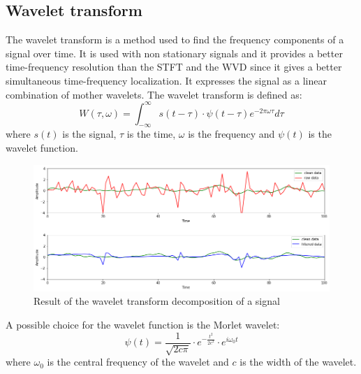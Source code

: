 \documentclass[a4paper]{sapthesis}
\begin{document}
\subsection{Wavelet transform}\label{sec:wavelet}
The wavelet transform\cite{wavelet} is a method used to find the frequency
components of a signal over time. It is used with non stationary signals and it
provides a better time-frequency resolution than the STFT and the WVD 
since it gives a better simultaneous time-frequency localization. \newline
It expresses the signal as a linear combination of mother wavelets.
The wavelet transform is defined as:
\begin{equation}
\label{eq:wavelet}
W(\tau, \omega) = \int_{-\infty}^{\infty} s(t-\tau) \cdot \psi(t-\tau) e^{-2\pi\omega \tau} d\tau
\end{equation}
where $s(t)$ is the signal, $\tau$ is the time, $\omega$ is the frequency
and $\psi(t)$ is the wavelet function. \newline
\begin{figure}[h]
  \includegraphics[scale=0.45]{wavelet_result}
  \centering
  \caption{Result of the wavelet transform decomposition of a signal
  }\label{fig:wt}
\end{figure}
A possible choice for the wavelet function is the Morlet wavelet:
\begin{equation}
\label{eq:wavelet2}
\psi(t) = \frac{1}{\sqrt{2c\pi}} \cdot e^{-\frac{t^2}{2c^2}} \cdot e^{i\omega_0 t}
\end{equation}
where $\omega_0$ is the central frequency of the wavelet and $c$ is the
width of the wavelet. \newline
\end{document}
